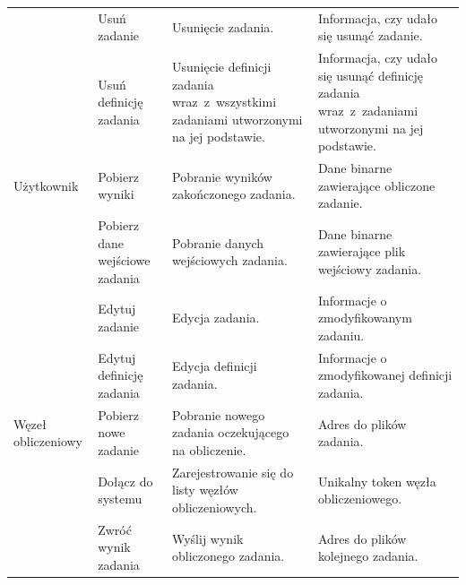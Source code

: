 \documentclass[a4paper,11pt,twoside]{report}
\theoremstyle{definition}
\begin{document}
\begin{longtable}{| p{} | p{} | p{} | p{} |}
                & Usuń zadanie
                & Usunięcie zadania.
                & Informacja, czy udało się usunąć zadanie. \\ \cline{2-4} 
                
                & Usuń definicję zadania
                & Usunięcie definicji zadania wraz~z~wszystkimi zadaniami utworzonymi na jej podstawie.
                & Informacja, czy udało się usunąć definicję zadania wraz~z~zadaniami utworzonymi na jej podstawie. \\ \cline{1-4} 
                
                Użytkownik
                & Pobierz wyniki
                & Pobranie wyników zakończonego zadania.
                & Dane binarne zawierające obliczone zadanie. \\ \cline{2-4} 
                
                & Pobierz dane wejściowe zadania
                & Pobranie danych wejściowych zadania.
                & Dane binarne zawierające plik wejściowy zadania. \\ \cline{2-4} 
                
                & Edytuj zadanie                 
                & Edycja zadania.
                & Informacje o zmodyfikowanym zadaniu. \\ \cline{2-4} 
                
                & Edytuj definicję zadania
                & Edycja definicji zadania.
                & Informacje o zmodyfikowanej definicji zadania. \\ \hline
                
                Węzeł obliczeniowy
                & Pobierz nowe zadanie
                & Pobranie nowego zadania oczekującego na obliczenie.
                & Adres do plików zadania. \\ \cline{2-4} 
                
                & Dołącz do systemu
                & Zarejestrowanie się do listy węzłów obliczeniowych.
                & Unikalny token węzła obliczeniowego. \\ \cline{2-4} 
                
                & Zwróć wynik zadania
                & Wyślij wynik obliczonego zadania.
                & Adres do plików kolejnego zadania. \\ \hline
                
            \end{longtable}
                        
\end{document}
